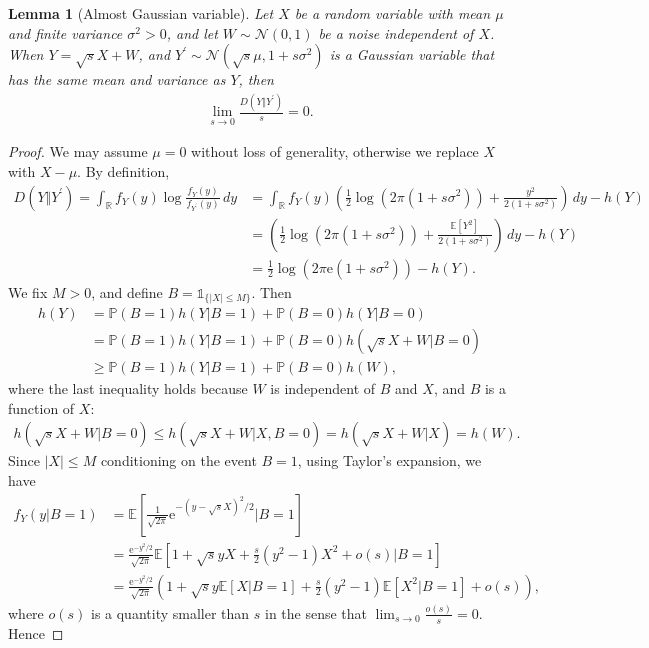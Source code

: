 \documentclass{article}
\numberwithin{equation}{section}
\newcommand{\e}{\mathrm{e}}
\newcommand{\E}{\mathbb{E}}
\newcommand{\bbP}{\mathbb{P}}
\newcommand{\bbR}{\mathbb{R}}
\renewcommand{\cal}{\mathcal}
\theoremstyle{plain}
\newtheorem{lemma}[theorem]{Lemma}
\theoremstyle{definition}
\begin{document}
\begin{lemma}[Almost Gaussian variable]\label{algaussdiv}
Let $X$ be a random variable with mean $\mu$ and finite variance $\sigma^2>0$, and let $W\sim\cal{N}(0,1)$ be a noise independent of $X$. When $Y=\sqrt{s}X+W$, and $Y^\prime\sim\cal{N}(\sqrt{s}\mu,1+s\sigma^2)$ is a Gaussian variable that has the same mean and variance as $Y$, then
\begin{align*}
	\lim_{s\to 0}\frac{D(Y\Vert Y^\prime)}{s}=0.
\end{align*}
\end{lemma}
\begin{proof}
We may assume $\mu=0$ without loss of generality, otherwise we replace $X$ with $X-\mu$. By definition,
\begin{align*}
	D(Y\Vert Y^\prime)=\int_{\bbR} f_Y(y)\log\frac{f_Y(y)}{f_{Y^\prime}(y)}\,dy&=\int_{\bbR}f_Y(y)\left(\frac{1}{2}\log(2\pi(1+s\sigma^2))+\frac{y^2}{2(1+s\sigma^2)}\right)\,dy-h(Y)\\
	&=\left(\frac{1}{2}\log\left(2\pi(1+s\sigma^2)\right)+\frac{\E[Y^2]}{2(1+s\sigma^2)}\right)\,dy-h(Y)\\
	&=\frac{1}{2}\log\left(2\pi\e(1+s\sigma^2)\right)-h(Y).
\end{align*}
We fix $M>0$, and define $B=\mathds{1}_{\{\vert X\vert\leq M\}}$. Then
\begin{align*}
	h(Y)&=\bbP(B=1)h(Y|B=1)+\bbP(B=0)h(Y|B=0)\\
	&=\bbP(B=1)h(Y|B=1)+\bbP(B=0)h(\sqrt{s}X+W|B=0)\\
	&\geq \bbP(B=1)h(Y|B=1)+\bbP(B=0)h(W),
\end{align*}
where the last inequality holds because $W$ is independent of $B$ and $X$, and $B$ is a function of $X$:
\begin{align*}
	h(\sqrt{s}X+W|B=0)\leq h(\sqrt{s}X+W|X,B=0)=h(\sqrt{s}X+W|X)=h(W).
\end{align*}
Since $\vert X\vert\leq M$ conditioning on the event $B=1$, using Taylor's expansion, we have
\begin{align*}
	f_Y(y|B=1)&=\E\left[\frac{1}{\sqrt{2\pi}}\e^{-(y-\sqrt{s}X)^2/2}\bigg|B=1\right]\\
	&=\frac{\e^{-y^2/2}}{\sqrt{2\pi}}\E\left[1+\sqrt{s}yX+\frac{s}{2}(y^2-1)X^2+o(s)\bigg|B=1\right]\\
	&=\frac{\e^{-y^2/2}}{\sqrt{2\pi}}\left(1+\sqrt{s}y\E[X|B=1]+\frac{s}{2}(y^2-1)\E[X^2|B=1]+o(s)\right),
\end{align*}
where $o(s)$ is a quantity smaller than $s$ in the sense that $\lim_{s\to 0}\frac{o(s)}{s}=0$. Hence

\end{proof}
\end{document}
